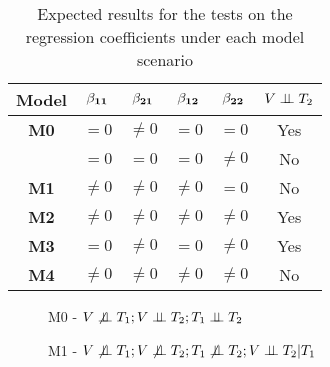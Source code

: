 \documentclass[12pt]{report}
\begin{document}
\begin{table}[H]
\centering
\caption{ Expected results for the tests on the regression coefficients under each model scenario }
\begin{tabular}{|c||cccc|c|}
\hline
\bf Model  & $\bf\beta_{11}$  &  $\bf\beta_{21}$   & $\bf\beta_{12}$    & $\bf\beta_{22}$    & $ V \perp \!\!\! \perp T_2$    \\ \hline \hline
\bf M0      &  $= 0$                & $\neq 0$              & $=0$                    & $=0$                    & Yes  \\ \hline 
               &  $= 0$                & $= 0$                  & $=0$                    & $\neq 0$               & No       \\ \hline
\bf M1      &  $\neq 0$            &  $\neq 0$             & $\neq0$                & $ = 0$                 & No  \\ \hline
\bf M2      &   $\neq0$            &  $\neq 0$             & $\neq0$                & $\neq0$               & Yes  \\ \hline
\bf M3      &   $=0$                &  $\neq 0$             & $=0$                    & $\neq0$               & Yes  \\ \hline
\bf M4      &   $\neq0$            &  $\neq 0$             & $\neq0$                & $\neq0$               & No  \\ \hline
\end{tabular}
\end{table}

\begin{figure}[H]
\begin{center}
\end{center}
\caption{M0 - $V\not\indep T_1 ; V \indep T_2; T_1 \indep T_2$ }
\end{figure}


\begin{figure}[H]
\begin{center}
\end{center}
\caption{M1 - $V\not\indep T_1 ; V \not\indep T_2; T_1 \not\indep T_2; V \indep T_2 | T_1$}
\end{figure}
\end{document}
